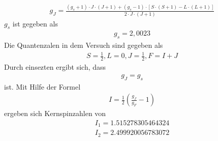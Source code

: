 \begin{align*}
  g_J = \frac{(g_s+1)\cdot J\cdot(J+1)+(g_s-1)\cdot[S\cdot (S+1)-L\cdot (L+1)]}{2\cdot J \cdot (J+1)}
\end{align*}
$g_s$ ist gegeben als
\begin{align*}
  g_s = 2,0023
\end{align*}
Die Quantenzalen in dem Versuch sind gegeben als
\begin{align*}
  S = \frac{1}{2}, L=0, J=\frac{1}{2}, F = I+J
\end{align*}
Durch einsezten ergibt sich, dass
\begin{align*}
  g_J=g_s
\end{align*}
ist.
Mit Hilfe der Formel
\begin{align*}
  I = \frac{1}{2}\left(\frac{g_J}{g_F}-1\right)
\end{align*}
ergeben sich Kernspinzahlen von
\begin{align*}
  I_1=1.515278305464324\\
  I_2=2.499920056783072
\end{align*}
